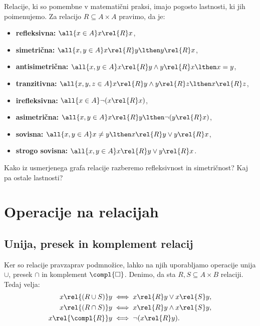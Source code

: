 Relacije, ki so pomembne v matematični praksi, imajo pogosto lastnosti, ki jih poimenujemo. Za relacijo $R \subseteq A \times A$ pravimo, da je:
%
\begin{itemize}
  \item \textbf{refleksivna:} $\all{x \in A} x \rel{R} x$,
  \item \textbf{simetrična:} $\all{x, y \in A} x \rel{R} y \lthen y \rel{R} x$,
  \item \textbf{antisimetrična:} $\all{x, y \in A} x \rel{R} y \land y \rel{R} x \lthen x = y$,
  \item \textbf{tranzitivna:} $\all{x, y, z \in A} x \rel{R} y \land y \rel{R} z \lthen x \rel{R} z$,
  \item \textbf{irefleksivna:} $\all{x \in A} \lnot (x \rel{R} x)$,
  \item \textbf{asimetrična:} $\all{x, y \in A} x \rel{R} y \lthen \lnot (y \rel{R} x)$,
  \item \textbf{sovisna:} $\all{x, y \in A} x \neq y \lthen x \rel{R} y \lor y \rel{R} x$,
  \item \textbf{strogo sovisna:} $\all{x, y \in A} x \rel{R} y \lor y \rel{R} x$.
\end{itemize}
%

\begin{vaja}
  Kako iz usmerjenega grafa relacije razberemo refleksivnost in simetričnost? Kaj pa ostale lastnosti?
\end{vaja}

\section{Operacije na relacijah}

\subsection{Unija, presek in komplement relacij}

Ker so relacije pravzaprav podmnožice, lahko na njih uporabljamo operacije unija $\cup$,
presek $\cap$ in komplement $\compl{\Box}$. Denimo, da sta $R, S \subseteq A \times B$ relaciji. Tedaj velja:
%
\begin{align*}
  x \rel{(R \cup S)} y &\iff x \rel{R} y \lor x \rel{S} y, \\
  x \rel{(R \cap S)} y &\iff x \rel{R} y \land x \rel{S} y, \\
  x \rel{\compl{R}} y &\iff \lnot (x \rel{R} y).
\end{align*}

